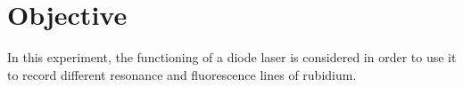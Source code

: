 \section{Objective}
\label{sec:objective}

In this experiment, the functioning of a diode laser is considered in order to
use it to record different resonance and fluorescence lines of rubidium.
